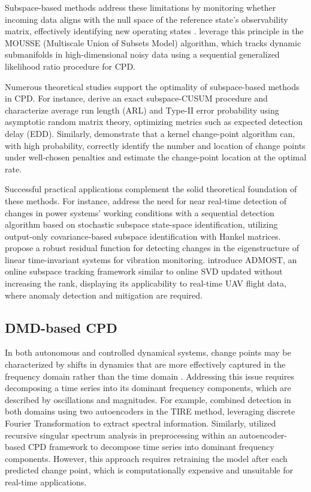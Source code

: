 Subspace-based methods address these limitations by monitoring whether incoming data aligns with the null space of the reference state's observability matrix, effectively identifying new operating states \citep{Dohler2013, Ye2023}. \citet{Xie2013} leverage this principle in the MOUSSE (Multiscale Union of Subsets Model) algorithm, which tracks dynamic submanifolds in high-dimensional noisy data using a sequential generalized likelihood ratio procedure for CPD.

Numerous theoretical studies support the optimality of subspace-based methods in CPD. For instance, \citet{Ye2023} derive an exact subspace-CUSUM procedure and characterize average run length (ARL) and Type-II error probability using asymptotic random matrix theory, optimizing metrics such as expected detection delay (EDD). Similarly, \citet{Garreau2018} demonstrate that a kernel change-point algorithm can, with high probability, correctly identify the number and location of change points under well-chosen penalties and estimate the change-point location at the optimal rate.

Successful practical applications complement the solid theoretical foundation of these methods. For instance, \citet{Hosur2019} address the need for near real-time detection of changes in power systems' working conditions with a sequential detection algorithm based on stochastic subspace state-space identification, utilizing output-only covariance-based subspace identification with Hankel matrices. \citet{Dohler2013} propose a robust residual function for detecting changes in the eigenstructure of linear time-invariant systems for vibration monitoring. \citet{He2019} introduce ADMOST, an online subspace tracking framework similar to online SVD updated without increasing the rank, displaying its applicability to real-time UAV flight data, where anomaly detection and mitigation are required.

\subsection{DMD-based CPD}
In both autonomous and controlled dynamical systems, change points may be characterized by shifts in dynamics that are more effectively captured in the frequency domain rather than the time domain \citep{DeRyck2021, Gupta2022}. Addressing this issue requires decomposing a time series into its dominant frequency components, which are described by oscillations and magnitudes. For example, \citet{DeRyck2021} combined detection in both domains using two autoencoders in the TIRE method, leveraging discrete Fourier Transformation to extract spectral information. Similarly, \citet{Gupta2022} utilized recursive singular spectrum analysis in preprocessing within an autoencoder-based CPD framework to decompose time series into dominant frequency components. However, this approach requires retraining the model after each predicted change point, which is computationally expensive and unsuitable for real-time applications.

